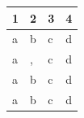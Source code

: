 \documentclass[11pt,a4paper]{article}
\begin{document}
\begin{table}[h]
\begin{tabular}{|l|l|l|l|}
\hline
1 & 2 & 3 & 4 \\ \hline
a & b & c & d \\ \hline
a & , & c & d \\ \hline
a & b & c & d \\ \hline
a & b & c & d \\ \hline
\end{tabular}
\end{table}
\end{document}
